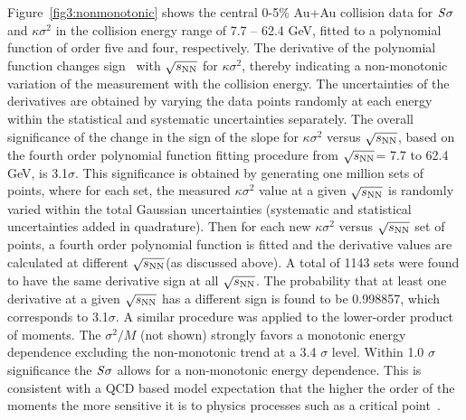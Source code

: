 \documentclass[10pt,aps,prc,twocolumn,floatfix]{revtex4-1}
\newcommand{\rootsnn} {\mbox{$\sqrt{s_{\rm NN}}$}\xspace}
\begin{document}
Figure~\ref{fig3:nonmonotonic} shows the central 0-5\% Au+Au collision data for $\it{S}\sigma$
and $\kappa\sigma^{2}$ in the collision energy range of 7.7 -- 62.4
GeV, fitted to a polynomial function of order five and four,
respectively.
The derivative of the polynomial function changes sign~\cite{sup} with \rootsnn for
$\kappa\sigma^{2}$, thereby indicating a non-monotonic variation of the measurement with the 
collision energy. The uncertainties of the derivatives are obtained by varying the data 
points randomly at each energy within the statistical and systematic uncertainties separately. 
The overall significance of the change in the sign of the slope for $\kappa\sigma^{2}$
versus \rootsnn, based on the fourth order polynomial function fitting 
procedure from \rootsnn = 7.7 to 62.4 GeV, is 
3.1$\sigma$.
This significance is obtained by generating one million 
sets of points, where for each set, the measured $\kappa\sigma^{2}$ value at a given \rootsnn is randomly varied within the 
total Gaussian uncertainties (systematic and statistical uncertainties added in quadrature). Then 
for each new $\kappa\sigma^{2}$ versus \rootsnn set of points, a fourth order polynomial function is fitted and 
the derivative values are calculated at different \rootsnn (as discussed 
above). A total of 1143 sets were found to have 
the same derivative sign at all \rootsnn. The probability that at least one derivative 
at a given \rootsnn has a different sign
is found 
to be 0.998857, which corresponds to 3.1$\sigma$. 
A similar procedure was applied to the lower-order product of moments.
The $\sigma^{2}/M$ (not shown) strongly favors a monotonic energy dependence
excluding the non-monotonic trend at a 3.4 $\sigma$ level.
Within 1.0 $\sigma$ significance the $\it{S}\sigma$ allows for a
non-monotonic energy dependence.
This is consistent with a QCD based model expectation that the
higher the order of the moments the more sensitive it is to physics processes such as a 
critical point~\cite{Stephanov:2008qz}.
\end{document}

